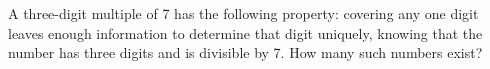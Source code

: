 A three-digit multiple of 7 has the following property: covering any one digit leaves enough information to determine that digit uniquely, knowing that the number has three digits and is divisible by 7. How many such numbers exist?
